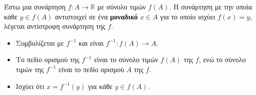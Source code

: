 Έστω μια συνάρτηση $ f:A\to\mathbb{R} $ με σύνολο τιμών $ f(A) $. Η συνάρτηση με την οποία κάθε $ y\in f(A) $ αντιστοιχεί σε ένα \textbf{μοναδικό} $ x\in A $ για το οποίο ισχύει $ f(x)=y $, λέγεται αντίστροφη συνάρτηση της $ f $.
\begin{center}
\end{center}
\begin{itemize}[itemsep=0mm]
\item Συμβολίζεται με $ f^{-1} $ και είναι $ f^{-1}:f(A)\to A $.
\item Το πεδίο ορισμού της $ f^{-1} $ είναι το σύνολο τιμών $ f(A) $ της $ f $, ενώ το σύνολο τιμών της $ f^{-1} $ είναι το πεδίο ορισμού $ A $ της $ f $.
\item Ισχύει ότι $ x=f^{-1}(y) $ για κάθε $ y\in f(A) $.
\end{itemize}
